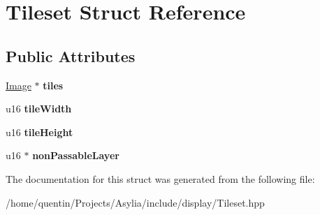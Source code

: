 \hypertarget{structTileset}{\section{Tileset Struct Reference}
\label{structTileset}
}
\subsection*{Public Attributes}
\begin{DoxyCompactItemize}
\item 
\hypertarget{structTileset_ad4b0634b055591c2f4a50104fe72eef6}{\hyperlink{classImage}{Image} $\ast$ {\bfseries tiles}}\label{structTileset_ad4b0634b055591c2f4a50104fe72eef6}

\item 
\hypertarget{structTileset_a06c3121f06b5543f9f4d57c6297aeb23}{u16 {\bfseries tile\-Width}}\label{structTileset_a06c3121f06b5543f9f4d57c6297aeb23}

\item 
\hypertarget{structTileset_ac83b45e8d0ebb54ae8ac014715ce166b}{u16 {\bfseries tile\-Height}}\label{structTileset_ac83b45e8d0ebb54ae8ac014715ce166b}

\item 
\hypertarget{structTileset_a8119ef6379c624f361a5929ec5a6a1d9}{u16 $\ast$ {\bfseries non\-Passable\-Layer}}\label{structTileset_a8119ef6379c624f361a5929ec5a6a1d9}

\end{DoxyCompactItemize}


The documentation for this struct was generated from the following file\-:\begin{DoxyCompactItemize}
\item 
/home/quentin/\-Projects/\-Asylia/include/display/Tileset.\-hpp\end{DoxyCompactItemize}
